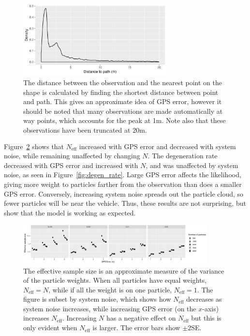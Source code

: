 \begin{figure}[tb]
    \centering
    \includegraphics[width=0.7\textwidth]{figures/04_model_results_dist.pdf}
    \caption{
        The distance between the observation and the nearest point on the shape
        is calculated by finding the shortest distance between point and path.
        This gives an approximate idea of GPS error, however it should be noted
        that many observations are made automatically at way points,
        which accounts for the peak at 1m.
        Note also that these observations have been truncated at 20m.
    }
    \label{fig:dist_to_route}
\end{figure}


Figure~\ref{fig:neff} shows that $N_\text{eff}$ increased
with GPS error and decreased with system noise,
while remaining unaffected by changing $N$.
The degeneration rate decreased with GPS error and increased with $N$,
and was unaffected by system noise,
as seen in Figure~\ref{fig:degen_rate}.
Large GPS error affects the likelihood,
giving more weight to particles farther from the observation
than does a smaller GPS error.
Conversely, increasing system noise spreads out the particle cloud,
so fewer particles will be near the vehicle.
Thus, these results are not surprising, 
but show that the model is working as expected.


\begin{figure}[tb]
    \centering
    \includegraphics[width=0.9\textwidth]{figures/04_model_results_neff.pdf}
    \caption{
        The effective sample size is an approximate measure of the variance
        of the particle weights.
        When all particles have equal weights, $N_\text{eff} = N$,
        while if all the weight is on one particle, $N_\text{eff} = 1$. 
        The figure is subset by system noise, which shows how $N_\text{eff}$ 
        decreases as system noise increases,
        while increasing GPS error (on the $x$-axis) increases $N_\text{eff}$.
        Increasing $N$ has a negative effect on $N_\text{eff}$ but this is
        only evident when $N_\text{eff}$ is larger.
        The error bars show $\pm 2$SE.
    }
    \label{fig:neff}
\end{figure}

